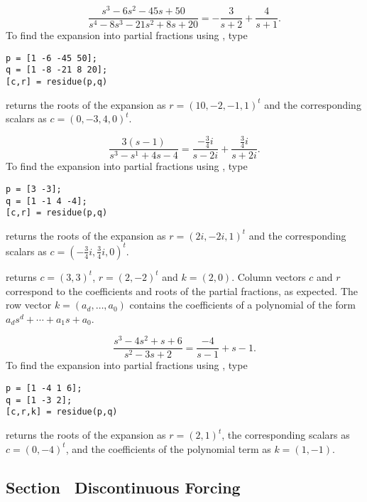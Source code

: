  \ans
\[
\frac{s^3 - 6s^2 - 45s + 50}{s^4 - 8s^3 - 21s^2 + 8s + 20}
= -\frac{3}{s + 2} + \frac{4}{s + 1}.
\]
\soln To find the expansion into partial fractions using \Matlabp, type
\begin{verbatim}
p = [1 -6 -45 50];
q = [1 -8 -21 8 20];
[c,r] = residue(p,q)
\end{verbatim}
\Matlab returns the roots of the expansion as $r = (10,-2,-1,1)^t$ and
the corresponding scalars as $c = (0,-3,4,0)^t$.

 \ans
\[
\frac{3(s - 1)}{s^3 - s^1 + 4s - 4} = \frac{-\frac{3}{4}i}{s - 2i}
+ \frac{\frac{3}{4}i}{s + 2i}.
\]
\soln To find the expansion into partial fractions using \Matlabp, type
\begin{verbatim}
p = [3 -3];
q = [1 -1 4 -4];
[c,r] = residue(p,q)
\end{verbatim}
\newpage
\Matlab returns the roots of the expansion as $r = (2i,-2i,1)^t$ and
the corresponding scalars as $c = (-\frac{3}{4}i,\frac{3}{4}i,0)^t$.

\Matlab returns $c = (3,3)^t$, $r = (2,-2)^t$ and $k = (2,0)$.
Column vectors $c$ and $r$ correspond to the coefficients and roots of
the partial fractions, as expected.  The row vector $k =
(a_d,\dots,a_0)$ contains the coefficients of a polynomial of the form
$a_ds^d + \cdots + a_1s + a_0$.

\ans
\[
\frac{s^3 - 4s^2 + s + 6}{s^2 - 3s + 2}
= \frac{-4}{s - 1} + s - 1.
\]
\soln To find the expansion into partial fractions using \Matlabp, type
\begin{verbatim}
p = [1 -4 1 6];
q = [1 -3 2];
[c,r,k] = residue(p,q)
\end{verbatim}
\Matlab returns the roots of the expansion as $r = (2,1)^t$, the
corresponding scalars as $c = (0,-4)^t$, and the coefficients of the
polynomial term as $k = (1,-1)$.



\subsection*{Section~\protect{\ref{S:13.4}} Discontinuous Forcing}

